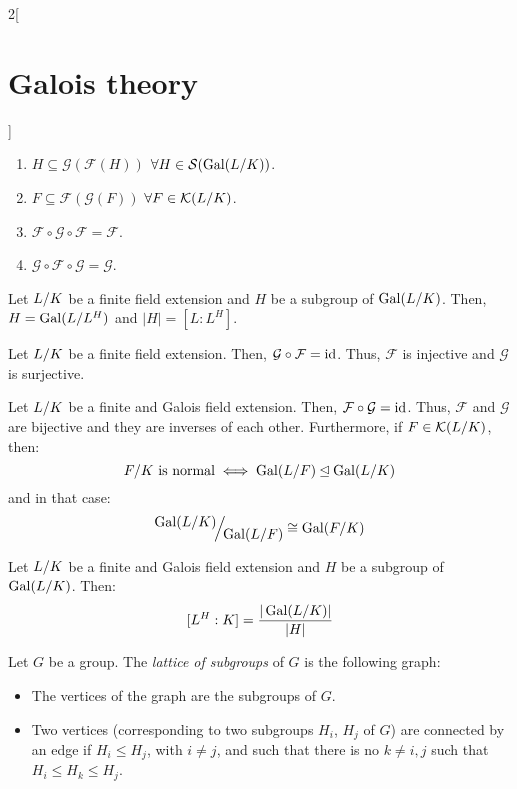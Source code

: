 \documentclass[../../../main.tex]{subfiles}
\begin{document}
\begin{multicols}{2}[\section{Galois theory}]
\begin{prop}
\begin{enumerate}
      \item $H\subseteq \mathcal{G}(\mathcal{F}(H))$ $\forall H\in \mathcal{S}(\Gal(\quot{L}{K}))$.
      \item $F\subseteq \mathcal{F}(\mathcal{G}(F))$ $\forall F\in \mathcal{K}(\quot{L}{K})$.
      \item $\mathcal{F}\circ\mathcal{G}\circ\mathcal{F}=\mathcal{F}$.
      \item $\mathcal{G}\circ\mathcal{F}\circ\mathcal{G}=\mathcal{G}$.
    \end{enumerate}
  \end{prop}
  \begin{lemma}
    Let $\quot{L}{K}$ be a finite field extension and $H$ be a subgroup of $\Gal(\quot{L}{K})$. Then, $H=\Gal(\quot{L}{L^H})$ and $|H|=[L:L^H]$.
  \end{lemma}
  \begin{corollary}
    Let $\quot{L}{K}$ be a finite field extension. Then, $\mathcal{G}\circ\mathcal{F}=\mathrm{id}$. Thus, $\mathcal{F}$ is injective and $\mathcal{G}$ is surjective.
  \end{corollary}
  \begin{theorem}
    Let $\quot{L}{K}$ be a finite and Galois field extension. Then, $\mathcal{F}\circ\mathcal{G}=\mathrm{id}$. Thus, $\mathcal{F}$ and $\mathcal{G}$ are bijective and they are inverses of each other. Furthermore, if $F\in\mathcal{K}(\quot{L}{K})$, then: $$\textstyle\quot{F}{K}\text{ is normal}\iff\Gal(\quot{L}{F})\unlhd\Gal(\quot{L}{K})$$ and in that case: $$\quot{\Gal(L/K)}{\Gal(L/F)}\cong\Gal(F/K)$$
  \end{theorem}
  \begin{corollary}
    Let $\quot{L}{K}$ be a finite and Galois field extension and $H$ be a subgroup of $\Gal(\quot{L}{K})$. Then: $$[L^H:K]=\frac{|\Gal(\quot{L}{K})|}{|H|}$$
  \end{corollary}
  \begin{definition}
    Let $G$ be a group. The \textit{lattice of subgroups} of $G$ is the following graph:
    \begin{itemize}
      \item The vertices of the graph are the subgroups of $G$.
      \item Two vertices (corresponding to two subgroups $H_i$, $H_j$ of $G$) are connected by an edge if $H_i\leq H_j$, with $i\ne j$, and such that there is no $k\ne i,j$ such that $H_i\leq H_k\leq H_j$.
    \end{itemize}
  \end{definition}

\end{multicols}
\end{document}
